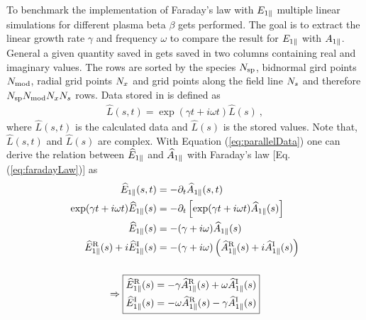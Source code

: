 To benchmark the implementation of Faraday's law with $E_{1\parallel}$ multiple linear simulations for different plasma beta $\beta$ gets performed. The goal is to extract the linear growth rate $\gamma$ and frequency $\omega$ to compare the result for $E_{1\parallel}$ with $A_{1\parallel}$. General a given quantity saved in  gets saved in two columns containing real and imaginary values. The rows are sorted by the species $N_\mathrm{sp}$, bidnormal gird points $N_\mathrm{mod}$, radial grid points $N_x$ and grid points along the field line $N_s$ and therefore $N_\mathrm{sp}N_\mathrm{mod}N_xN_s$ rows. Data stored in  is defined as
\begin{gather}
    \widehat{L}(s,t) = \exp (\gamma t + i\omega t) \widehat{L}(s)~,
    \label{eq:parallelData}
\end{gather}
where $\widehat{L}(s,t)$ is the calculated data and $\widehat{L}(s)$ is the stored values. \cite{GKWManual} Note that, $\widehat{L}(s,t)$ and $\widehat{L}(s)$ are complex. With Equation (\ref{eq:parallelData}) one can derive the relation between $\widehat{E}_{1\parallel}$ and $\widehat{A}_{1\parallel}$ with Faraday's law [Eq. (\ref{eq:faradayLaw})] as
\begin{gather}
    \begin{aligned}
        \widehat{E}_{1\parallel}(s,t) &= - \partial_t \widehat{A}_{1\parallel}(s,t) \\
        \exp (\gamma t + i\omega t) \widehat{E}_{1\parallel}(s) &= - \partial_t \left[\exp(\gamma t + i\omega t) \widehat{A}_{1\parallel}(s)\right] \\
        \widehat{E}_{1\parallel}(s) &= - (\gamma + i\omega) \widehat{A}_{1\parallel}(s) \\
        \widehat{E}_{1\parallel}^\mathrm{R}(s) + i \widehat{E}_{1\parallel}^\mathrm{I}(s) &= - (\gamma + i\omega) \left(\widehat{A}_{1\parallel}^\mathrm{R}(s) + i \widehat{A}_{1\parallel}^\mathrm{I}(s)\right)
    \end{aligned} \\[0.5cm] 
    \Rightarrow \boxed{
    \begin{aligned}
        \widehat{E}_{1\parallel}^\mathrm{R}(s) &= - \gamma \widehat{A}_{1\parallel}^\mathrm{R}(s) + \omega \widehat{A}_{1\parallel}^\mathrm{I}(s) \\ 
        \widehat{E}_{1\parallel}^\mathrm{I}(s) &= - \omega \widehat{A}_{1\parallel}^\mathrm{R}(s) - \gamma \widehat{A}_{1\parallel}^\mathrm{I}(s)   
    \end{aligned}
    } \nonumber
    \label{eq:parallelDataEparEqApar}
\end{gather}

